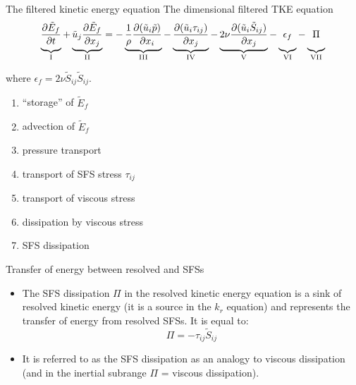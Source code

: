 \begin{frame}{The filtered kinetic energy equation}
The dimensional filtered TKE equation
$$\underbrace{\vphantom{ \tilde u_j\frac{\partial \tilde E_f}{\partial x_j}}  \frac{\partial \tilde E_f}{\partial t}}_{\text{I}} + \underbrace{\tilde u_j\frac{\partial \tilde E_f}{\partial x_j}}_{\text{II}} = -\underbrace{\vphantom{ \tilde u_j\frac{\partial \tilde E_f}{\partial x_j}}\frac{1}{\rho} \frac{\partial (\tilde u_i \tilde p)}{\partial x_i}}_{\text{III}} - \underbrace{\vphantom{ \tilde  u_j\frac{\partial \tilde E_f}{\partial x_j}}\frac{\partial (\tilde u_i \tau_{ij})}{\partial x_j}}_{\text{IV}} - \underbrace{\vphantom{ \tilde u_j\frac{\partial \tilde E_f}{\partial x_j}}2\nu\frac{\partial (\tilde u_i \tilde S_{ij})}{\partial x_j}}_{\text{V}} - \underbrace{\vphantom{ \tilde u_j\frac{\partial \tilde E_f}{\partial x_j}}\epsilon_f}_{\text{VI}} -\underbrace{\vphantom{ \tilde u_j\frac{\partial \tilde E_f}{\partial x_j}}\Pi}_{\text{VII}}$$

where $\epsilon_f = 2\nu\tilde S_{ij} \tilde S_{ij}$.

\begin{enumerate}[I]
\item ``storage'' of $\tilde E_f$
\item advection of $\tilde E_f$
\item pressure transport
\item transport of SFS stress $\tau_{ij}$
\item transport of viscous stress
\item dissipation by viscous stress
\item SFS dissipation
\end{enumerate}

\end{frame}


\begin{frame}{Transfer of energy between resolved and SFSs}
\begin{itemize}
	\item The SFS dissipation $\Pi$ in the resolved kinetic energy equation is a sink of resolved kinetic energy (it is a source in the $k_r$ equation) and represents the transfer of energy from resolved SFSs. It is equal to:
	$$\Pi = -\tau_{ij} \tilde S_{ij}$$
	\item It is referred to as the SFS dissipation as an analogy to viscous dissipation (and in the inertial subrange $\Pi$ = viscous dissipation).
\end{itemize}
\end{frame}

